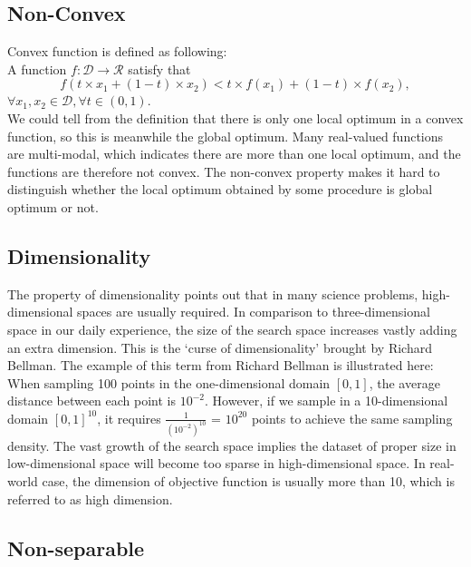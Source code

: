 \subsection{Non-Convex}

Convex function is defined as following:\\ A function $f \colon
\mathcal{D} \to \mathcal{R}$ satisfy that \[f(t \times x_1+(1-t) \times
x_2) < t \times f(x_1) + (1-t) \times f(x_2),\] $\forall x_1,x_2 \in
\mathcal{D},  \forall t \in (0,1)$.\\
We could tell from the definition that there is only one local optimum
in a convex function, so this is meanwhile the global optimum.
Many real-valued functions are multi-modal, which indicates there are
more than one local optimum, and the functions are therefore not convex.
The non-convex property makes it hard to distinguish whether the local
optimum obtained by some procedure is global optimum or not.

\subsection{Dimensionality}

The property of dimensionality points out that in many science problems,
high-dimensional spaces are usually required.
In comparison to three-dimensional space in our daily experience, the
size of the search space increases vastly adding an extra dimension.
This is the `curse of dimensionality’ brought by Richard Bellman.
The example of this term from Richard Bellman is illustrated here:
When sampling 100 points in the one-dimensional domain $[0,1]$, the
average distance between each point is $10^{-2}$.
However, if we sample in a 10-dimensional domain $[ 0 , 1 ]^{10}$, it
requires $\frac{1}{(10^{-2})^{10}}$ = $10^{20}$ points to achieve the
same sampling density.
The vast growth of the search space implies the dataset of proper size
in low-dimensional space will become too sparse in high-dimensional
space.
In real-world case, the dimension of objective function is usually more
than 10, which is referred to as high dimension.

\subsection{Non-separable}

